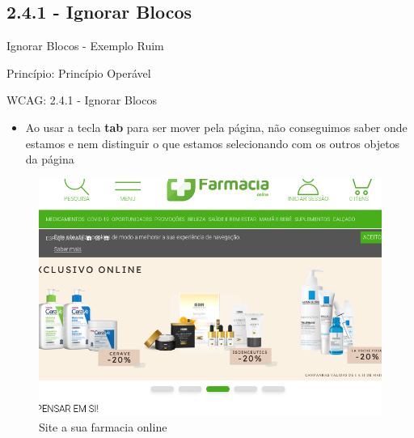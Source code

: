 \documentclass{beamer}
\begin{document}
\subsection{2.4.1 - Ignorar Blocos}

\begin{frame}{Ignorar Blocos - Exemplo Ruim}

Princípio: Princípio Operável

WCAG: 2.4.1 - Ignorar Blocos

\begin{itemize}
	\item Ao usar a tecla \textbf{tab} para ser mover pela página, não conseguimos saber onde estamos e nem distinguir o que estamos selecionando com os outros objetos da página
\end{itemize}
\begin{figure}
    \centering
    \includegraphics[scale=0.2]{images/no_ignore.png}
    \caption{Site a sua farmacia online}
\end{figure}

\end{frame}
\end{document}

